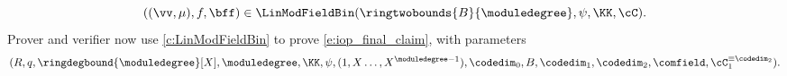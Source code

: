 \begin{construction}
\begin{enumerate}[leftmargin=*]
\begin{itemize}[leftmargin=*]
%
\begin{equation}\label{e:iop_final_claim}
((\vv,\mu),f,\bff) \in \LinModFieldBin(\ringtwobounds{B}{\moduledegree},\psi,\KK, \cC).
\end{equation}
%
Prover and verifier now use \cref{c:LinModFieldBin} to prove  \eqref{e:iop_final_claim}, with parameters $$(R,q,\ringdegbound{\moduledegree}[X],\moduledegree,\KK, \psi, (1, X \ldots, X^{\moduledegree-1}), \codedim_0, B, \codedim_1,\codedim_2, \comfield,\cC_1^{\equiv \codedim_2}).$$
%
\end{itemize}
\end{enumerate}
    
\end{construction}


\begin{remark}\label{r:sampling_field}
\end{remark}





